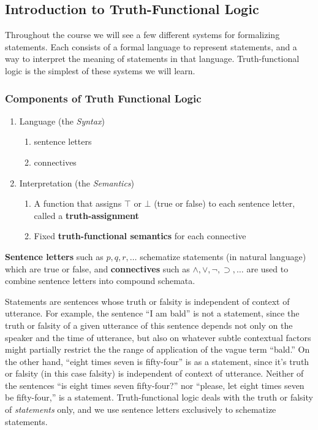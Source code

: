 \subsection{Introduction to Truth-Functional Logic}
Throughout the course we will see a few different systems for formalizing statements. Each consists of a formal language to represent statements, and a way to interpret the meaning of statements in that language. Truth-functional logic is the simplest of these systems we will learn. 

\subsubsection*{Components of Truth Functional Logic}
\begin{enumerate}
    \item Language (the \emph{Syntax})
    \begin{enumerate}
        \item sentence letters
        \item connectives
    \end{enumerate}
    \item Interpretation (the \emph{Semantics})
    \begin{enumerate}
        \item A function that assigns $\top$ or $\bot$ (true or false) to each sentence letter, called a \textbf{truth-assignment}
        \item Fixed \textbf{truth-functional semantics} for each connective
    \end{enumerate}
\end{enumerate}

\textbf{Sentence letters} such as $p, q, r, \ldots$ schematize statements (in natural language) which are true or false, and \textbf{connectives} such as $\wedge, \vee, \neg, \supset, \ldots$ are used to combine sentence letters into compound schemata. 

\begin{aside}
Statements are sentences whose truth or falsity is independent of context of utterance. For example, the sentence ``I am bald'' is not a statement, since the truth or falsity of a given utterance of this sentence depends not only on the speaker and the time of utterance, but also on whatever subtle contextual factors might partially restrict the the range of application of the vague term ``bald.'' On the other hand, ``eight times seven is fifty-four'' is as a statement, since it's truth or falsity (in this case falsity) is independent of context of utterance. Neither of the sentences ``is eight times seven fifty-four?'' nor ``please, let eight times seven be fifty-four,'' is a statement. Truth-functional logic deals with the truth or falsity of \emph{statements} only, and we use sentence letters exclusively to schematize statements. 
\end{aside}